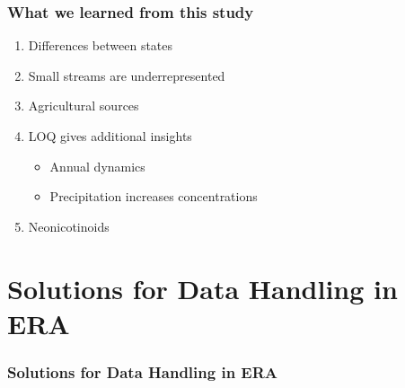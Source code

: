 \documentclass[
	12pt
	]{beamer}
\begin{document}
\begin{frame}
\frametitle{What we learned from this study}
	\begin{enumerate}
		\item Differences between \alert{states}
		\item Small streams are \alert{underrepresented}
		\item \alert{Agricultural} sources
		\item \alert{LOQ} gives additional insights
			\begin{itemize}
				\item Annual \alert{dynamics}
				\item \alert{Precipitation} increases concentrations
			\end{itemize}
		\item \alert{Neonicotinoids} 
	\end{enumerate}
\end{frame}



\section{Solutions for Data Handling in ERA}

\begingroup
\footnotesize %
\begin{frame}[noframenumbering]
\frametitle{Solutions for Data Handling in ERA}
    \vspace*{0mm}
	\resizebox{1.02\textwidth}{!}{
		\hspace*{-20mm}
	}
\end{frame}
\endgroup
\end{document}
